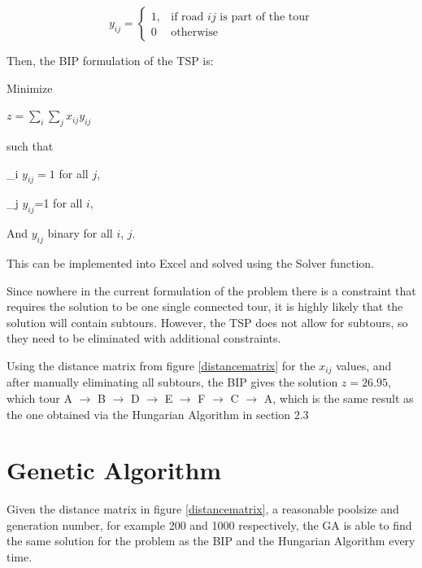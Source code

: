\[
y_{ij}= 
\begin{cases}
1, & \text{if road $ij$ is part of the tour}\\
0 & \text{otherwise}
\end{cases}
\]
	

\vspace{5mm}
Then, the BIP formulation of the TSP is:
\vspace{5mm}	

Minimize

\vspace{-3mm}	
\begin{center}
$z = \sum_{i} \sum_{j} x_{ij}y_{ij}$
\end{center}	 

such that
\vspace{-3mm}	
\begin{center}
	\sum_{i} $y_{ij}=1$ for all $j$,
	
	\sum_{j} $y_{ij}$=1 for all $i$,
	
	And $y_{ij}$ binary for all $i$, $j$.
\end{center}	
	
	
This can be implemented into Excel and solved using the Solver function.
\vspace{5mm}

Since nowhere in the current formulation of the problem there is a constraint that requires the solution to be one single connected tour, it is highly likely that the solution will contain subtours. However, the TSP does not allow for subtours, so they need to be eliminated with additional constraints.
\vspace{5mm}

Using the distance matrix from figure \ref{distancematrix} for the $x_{ij}$ values, and after manually eliminating all subtours, the BIP gives the solution $z=26.95$, which tour A $\rightarrow$ B $\rightarrow$ D $\rightarrow$ E $\rightarrow$ F $\rightarrow$ C $\rightarrow$ A, which is the same result as the one obtained via the Hungarian Algorithm in section 2.3
	
	
	
	
\section{Genetic Algorithm}	
	
Given the distance matrix in figure \ref{distancematrix}, a reasonable poolsize and generation number, for example 200 and 1000 respectively, the GA is able to find the same solution for the problem as the BIP and the Hungarian Algorithm every time.



